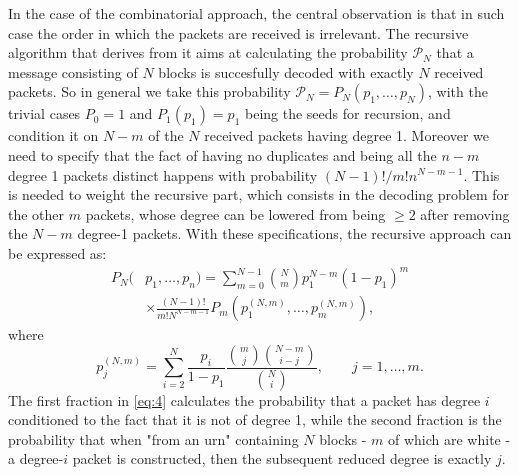 In the case of the combinatorial approach, the central observation is that in such case the order in which the packets are received is irrelevant. The recursive algorithm that derives from it aims at calculating the probability $\mathcal{P}_N$ that a message consisting of $N$ blocks is succesfully decoded with exactly $N$ received packets. So in general we take this probability $\mathcal{P}_N = P_N(p_1,\dots,p_N)$, with the trivial cases $P_0=1$ and $P_1(p_1) = p_1$ being the seeds for recursion, and condition it on $N-m$ of the $N$ received packets having degree 1. Moreover we need to specify that the fact of having no duplicates and being all the $n-m$ degree 1 packets distinct happens with probability $(N-1)!/m!n^{N-m-1}$. This is needed to weight the recursive part, which consists in the decoding problem for the other $m$ packets, whose degree can be lowered from being $\geq 2$ after removing the $N-m$ degree-1 packets. With these specifications, the recursive approach can be expressed as:
\begin{align}
    P_N(&p_1,\dots,p_n) = \sum_{m=0}^{N-1}\binom{N}{m}p_1^{N-m}(1-p_1)^m\\
    &\times\frac{(N-1)!}{m!N^{N-m-1}}P_m(p_1^{(N,m)},\dots,p_m^{(N,m)}),
    \label{eq:3}
\end{align}
where
\begin{equation}
  p_j^{(N,m)} = \sum_{i=2}^{N}\frac{p_i}{1-p_1}\frac{\binom{m}{j}\binom{N-m}{i-j}}{\binom{N}{i}}, \qquad j = 1,\dots,m.
  \label{eq:4}
\end{equation}
The first fraction in \autoref{eq:4} calculates the probability that a packet has degree $i$ conditioned to the fact that it is not of degree 1, while the second fraction is the probability that when "from an urn" containing $N$ blocks - $m$ of which are white - a degree-$i$ packet is constructed, then the subsequent reduced degree is exactly $j$\cite{Hyytia2007}.

